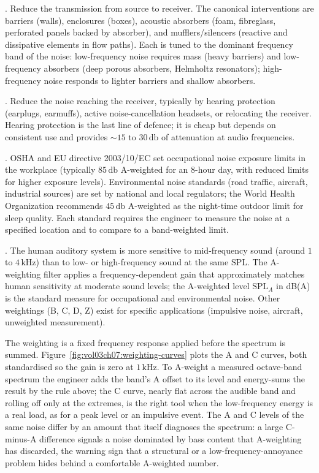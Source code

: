 . Reduce the transmission from source to receiver. The
canonical interventions are barriers (walls), enclosures (boxes),
acoustic absorbers (foam, fibreglass, perforated panels backed by
absorber), and mufflers/silencers (reactive and dissipative
elements in flow paths). Each is tuned to the dominant frequency
band of the noise: low-frequency noise requires mass (heavy
barriers) and low-frequency absorbers (deep porous absorbers,
Helmholtz resonators); high-frequency noise responds to lighter
barriers and shallow absorbers.

. Reduce the noise reaching the receiver, typically
by hearing protection (earplugs, earmuffs), active noise-cancellation
headsets, or relocating the receiver. Hearing protection is the
last line of defence; it is cheap but depends on consistent use
and provides $\sim 15$ to $30\,\si{\decibel}$ of attenuation at
audio frequencies.

. OSHA and EU directive 2003/10/EC set
occupational noise exposure limits in the workplace (typically
$85\,\si{\decibel}$ A-weighted for an $8$-hour day, with reduced
limits for higher exposure levels). Environmental noise standards
(road traffic, aircraft, industrial sources) are set by national
and local regulators; the World Health Organization recommends
$45\,\si{\decibel}$ A-weighted as the night-time outdoor limit for
sleep quality. Each standard requires the engineer to measure the
noise at a specified location and to compare to a band-weighted
limit.

. The human auditory system is more sensitive
to mid-frequency sound (around $1$ to $4\,\si{\kilo\hertz}$) than to
low- or high-frequency sound at the same SPL. The A-weighting filter
applies a frequency-dependent gain that approximately matches human
sensitivity at moderate sound levels; the A-weighted level
$\text{SPL}_A$ in dB(A) is the standard measure for occupational and
environmental noise. Other weightings (B, C, D, Z) exist for
specific applications (impulsive noise, aircraft, unweighted
measurement).



The weighting is a fixed frequency response applied before the spectrum
is summed. Figure~\ref{fig:vol03ch07:weighting-curves} plots the A and C
curves, both standardised so the gain is zero at $1\,\si{\kilo\hertz}$. To
A-weight a measured octave-band spectrum the engineer adds the band's A
offset to its level and energy-sums the result by the rule above; the C
curve, nearly flat across the audible band and rolling off only at the
extremes, is the right tool when the low-frequency energy is a real load,
as for a peak level or an impulsive event. The A and C levels of the same
noise differ by an amount that itself diagnoses the spectrum: a large
C-minus-A difference signals a noise dominated by bass content that
A-weighting has discarded, the warning sign that a structural or a
low-frequency-annoyance problem hides behind a comfortable A-weighted
number.

